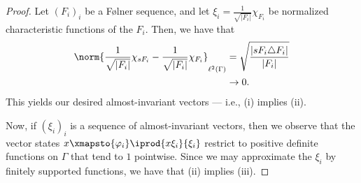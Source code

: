 \documentclass[10pt]{mypackage}
\begin{document}
\begin{proof}
  Let $\left( F_i \right)_i$ be a Følner sequence, and let $\xi_i = \frac{1}{\sqrt{\left\vert F_i \right\vert}} \chi_{F_i}$ be normalized characteristic functions of the $F_i$. Then, we have that
  \begin{align*}
    \norm{\frac{1}{\sqrt{\left\vert F_i \right\vert}}\chi_{sF_i} - \frac{1}{\sqrt{\left\vert F_i \right\vert}}\chi_{F_i}}_{\ell^2\left( \Gamma \right)} &= \sqrt{\frac{\left\vert sF_i\triangle F_i \right\vert}{\left\vert F_i \right\vert}}\\
                                                             &\to 0.
  \end{align*}
  This yields our desired almost-invariant vectors --- i.e., (i) implies (ii).

  Now, if $\left( \xi_i \right)_i$ is a sequence of almost-invariant vectors, then we observe that the vector states $x\xmapsto{\varphi_i} \iprod{x\xi_i}{\xi_i}$ restrict to positive definite functions on $\Gamma$ that tend to $1$ pointwise. Since we may approximate the $\xi_i$ by finitely supported functions, we have that (ii) implies (iii).


\end{proof}
\end{document}

